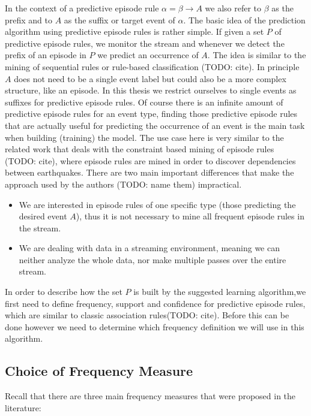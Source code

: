 In the context of a predictive episode rule $\alpha = \beta \rightarrow A$ we also refer to $\beta$ as the prefix and to $A$ as the suffix or target event of $\alpha$.
The basic idea of the prediction algorithm using predictive episode rules is rather simple. If given a set $P$ of predictive episode rules, we monitor the stream and whenever we detect the prefix of an episode in $P$ we predict an occurrence of $A$. The idea is similar to the mining of sequential rules or rule-based classification (TODO: cite). In principle $A$ does not need to be a single event label but could also be a more complex structure, like an episode. In this thesis we restrict ourselves to single events as suffixes for predictive episode rules.
Of course there is an infinite amount of predictive episode rules for an event type, finding those predictive episode rules that are actually useful for predicting the occurrence of an event is the main task when building (training) the model. The use case here is very similar to the related work that deals with the constraint based mining of episode rules (TODO: cite), where episode rules are mined in order to discover dependencies between earthquakes. There are two main important differences that make the approach used by the authors (TODO: name them) impractical.

\begin{itemize}
 \item We are interested in episode rules of one specific type (those predicting the desired event $A$), thus it is not necessary to mine all frequent episode rules in the stream.
 \item We are dealing with data in a streaming environment, meaning we can neither analyze the whole data, nor make multiple passes over the entire stream.
\end{itemize}

In order to describe how the set $P$ is built by the suggested learning algorithm,we first need to define frequency, support and confidence for predictive episode rules, which are similar to classic association rules(TODO: cite). Before this can be done however we need to determine which frequency definition we will use in this algorithm. 

\subsection{Choice of Frequency Measure}

Recall that there are three main frequency measures that were proposed in the literature:

